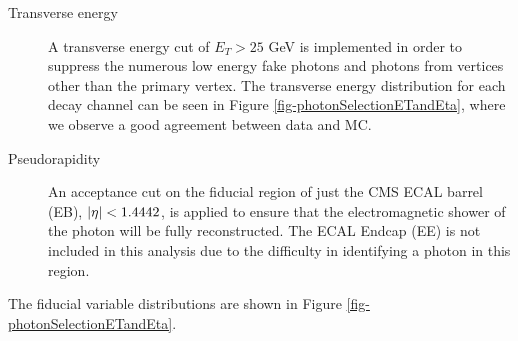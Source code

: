 \begin{description}

\item[Transverse energy] A transverse energy cut of $E_T > 25$ GeV is implemented in order to suppress the numerous low energy fake photons and photons from vertices other than the primary vertex. The transverse energy distribution for each decay channel can be seen in Figure \ref{fig-photonSelectionETandEta}, where we observe a good agreement between data and MC.

\item[Pseudorapidity] An acceptance cut on the fiducial region of just the CMS ECAL barrel (EB), $\lvert \eta \rvert < 1.4442$, is applied to ensure that the electromagnetic shower of the photon will be fully reconstructed. The ECAL Endcap (EE) is not included in this analysis due to the difficulty in identifying a photon in this region.

\end{description}

The fiducial variable distributions are shown in Figure \ref{fig-photonSelectionETandEta}.

